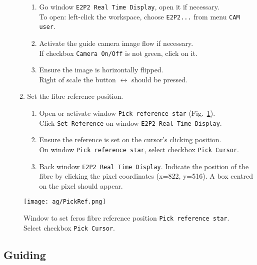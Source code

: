 \documentclass[11pt,fleqn]{book} %
\begin{document}
\begin{enumerate}
\begin{enumerate}
      \begin{enumerate}
      \item Go window \texttt{E2P2 Real Time Display}, open it if necessary.\\
            To open: left-click the workspace, choose \texttt{E2P2...} from menu \texttt{CAM user}.
      \item Activate the guide camera image flow if necessary.\\
            If checkbox \texttt{Camera On/Off} is not green, click on it.
      \item Ensure the image is horizontally flipped.\\
            Right of scale the button $\leftrightarrow$ should be pressed.
      \end{enumerate}
    \item Set the fibre reference position.
    \begin{enumerate}
      \item Open or activate window \texttt{Pick reference star} (Fig.~\ref{fig:pickref}).\\
            Click \texttt{Set Reference} on window  \texttt{E2P2 Real Time Display}.
      \item Ensure the reference is set on the cursor's clicking position.\\
            On window \texttt{Pick reference star}, select checkbox \texttt{Pick Cursor}.
      \item Back window \texttt{E2P2 Real Time Display}. Indicate the position of the fibre by
      clicking the pixel coordinates (x=822, y=516). A box centred on the pixel should appear.
    \end{enumerate}
  \end{enumerate}
\end{enumerate}

\begin{figure}[!ht]
\centering
\texttt{[image: ag/PickRef.png]}
\caption[Window to set FEROS fibre reference position]{Window to set \gls{feros} fibre reference position \texttt{Pick reference star}. Select checkbox \texttt{Pick Cursor}.}
\label{fig:pickref}
\end{figure}

\newpage

\subsection{Guiding}
\label{sec:ferosguiding}
\end{document}
